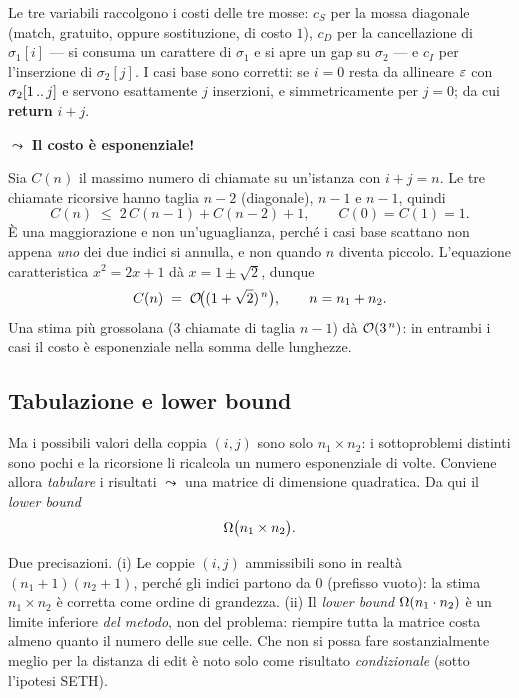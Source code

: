 Le tre variabili raccolgono i costi delle tre mosse: $c_S$ per la mossa
diagonale (match, gratuito, oppure sostituzione, di costo $1$), $c_D$ per la
cancellazione di $\sigma_1[i]$ --- si consuma un carattere di $\sigma_1$ e si
apre un gap su $\sigma_2$ --- e $c_I$ per l'inserzione di $\sigma_2[j]$. I casi
base sono corretti: se $i=0$ resta da allineare $\varepsilon$ con
$\sigma_2[1\,..\,j]$ e servono esattamente $j$ inserzioni, e simmetricamente per
$j=0$; da cui \textbf{return} $i+j$.

\medskip
\noindent$\leadsto$\; \textbf{Il costo è esponenziale!}

\begin{osservazione}
  Sia $C(n)$ il massimo numero di chiamate su un'istanza con $i+j=n$. Le tre
  chiamate ricorsive hanno taglia $n-2$ (diagonale), $n-1$ e $n-1$, quindi
  \[
    C(n) \;\le\; 2\,C(n-1) + C(n-2) + 1, \qquad C(0)=C(1)=1 .
  \]
  È una maggiorazione e non un'uguaglianza, perché i casi base scattano non
  appena \emph{uno} dei due indici si annulla, e non quando $n$ diventa piccolo.
  L'equazione caratteristica $x^2=2x+1$ dà $x=1\pm\sqrt2$, dunque
  \[
    C(n)\;=\;\mathcal{O}\!\big((1+\sqrt{2})^{\,n}\big),
    \qquad n=n_1+n_2 .
  \]
  Una stima più grossolana ($3$ chiamate di taglia $n-1$) dà $\mathcal{O}(3^{\,n})$: in
  entrambi i casi il costo è esponenziale nella somma delle lunghezze.
\end{osservazione}

\subsection{Tabulazione e lower bound}

Ma i possibili valori della coppia $(i,j)$ sono solo $n_1\times n_2$: i
sottoproblemi distinti sono pochi e la ricorsione li ricalcola un numero
esponenziale di volte. Conviene allora \emph{tabulare} i risultati $\leadsto$
una matrice di dimensione quadratica. Da qui il \emph{lower bound}
\[
  \Omega\big(n_1\times n_2\big).
\]

\begin{osservazione}
  Due precisazioni. (i) Le coppie $(i,j)$ ammissibili sono in realtà
  $(n_1+1)(n_2+1)$, perché gli indici partono da $0$ (prefisso vuoto): la stima
  $n_1\times n_2$ è corretta come ordine di grandezza. (ii) Il \emph{lower
  bound} $\Omega(n_1\cdot n_2)$ è un limite inferiore \emph{del metodo}, non del
  problema: riempire tutta la matrice costa almeno quanto il numero delle sue
  celle. Che non si possa fare sostanzialmente meglio per la distanza di edit è
  noto solo come risultato \emph{condizionale} (sotto l'ipotesi SETH).
\end{osservazione}

